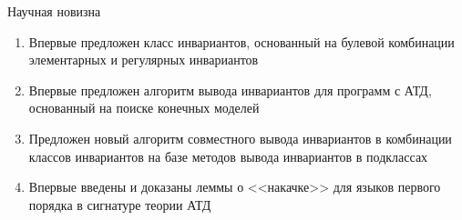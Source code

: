 \documentclass[22pt,aspectratio=169]{beamer}
\begin{document}
\begin{framesection}{Научная новизна}
\begin{enumerate}
\item Впервые предложен класс инвариантов, основанный на булевой комбинации элементарных и регулярных инвариантов
\item Впервые предложен алгоритм вывода инвариантов для программ с АТД, основанный на поиске конечных моделей
\item Предложен новый алгоритм совместного вывода инвариантов в комбинации классов инвариантов на базе методов вывода инвариантов в подклассах
\item Впервые введены и доказаны леммы о <<накачке>> для языков первого порядка в сигнатуре теории АТД
\end{enumerate}
\end{framesection}
\end{document}
